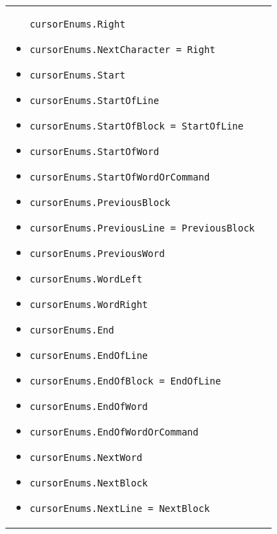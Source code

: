 \begin{longtable}{XX}
\begin{itemize}
      \texttt{cursorEnums.Right}
    \item
      \texttt{cursorEnums.NextCharacter = Right}
    \item
      \texttt{cursorEnums.Start}
    \item
      \texttt{cursorEnums.StartOfLine}
    \item
      \texttt{cursorEnums.StartOfBlock = StartOfLine}
    \item
      \texttt{cursorEnums.StartOfWord}
    \item
      \texttt{cursorEnums.StartOfWordOrCommand}
    \item
      \texttt{cursorEnums.PreviousBlock}
    \item
      \texttt{cursorEnums.PreviousLine = PreviousBlock}
    \item
      \texttt{cursorEnums.PreviousWord}
    \item
      \texttt{cursorEnums.WordLeft}
    \item
      \texttt{cursorEnums.WordRight}
    \item
      \texttt{cursorEnums.End}
    \item
      \texttt{cursorEnums.EndOfLine}
    \item
      \texttt{cursorEnums.EndOfBlock = EndOfLine}
    \item
      \texttt{cursorEnums.EndOfWord}
    \item
      \texttt{cursorEnums.EndOfWordOrCommand}
    \item
      \texttt{cursorEnums.NextWord}
    \item
      \texttt{cursorEnums.NextBlock}
    \item
      \texttt{cursorEnums.NextLine = NextBlock}
    \end{itemize}


\end{longtable}
